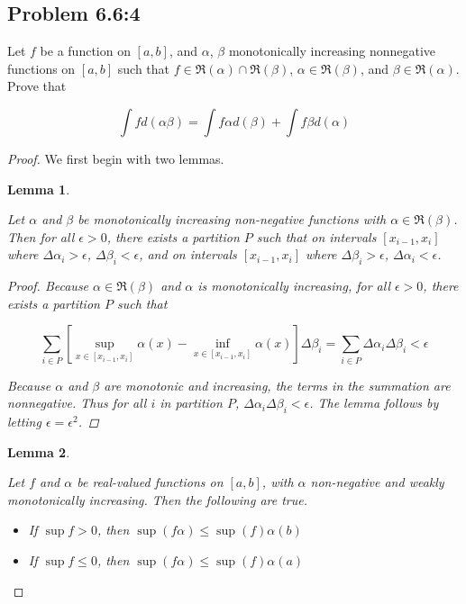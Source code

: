\documentclass{amsart}
\newcommand{\RiemannIntable}{
  \mathfrak{R}
}
\newtheorem{lemma}{Lemma}[subsubsection]
\begin{document}
\subsection*{Problem 6.6:4}

Let $f$ be a function on $[a, b]$, and $\alpha$, $\beta$ monotonically increasing nonnegative functions on $[a, b]$ such that $f \in \RiemannIntable(\alpha) \cap \RiemannIntable(\beta)$, $\alpha \in \RiemannIntable(\beta)$, and $\beta \in \RiemannIntable(\alpha)$. Prove that

\[
\int f d(\alpha \beta) = \int f \alpha d(\beta) + \int f \beta d(\alpha)
\]

\begin{proof}

We first begin with two lemmas.

\begin{lemma}
\label{alphaAndBeta}

Let $\alpha$ and $\beta$ be monotonically increasing non-negative functions with $\alpha \in \RiemannIntable(\beta)$. Then for all $\epsilon > 0$, there exists a partition $P$ such that on intervals $[x_{i-1}, x_i]$ where $\Delta \alpha_i > \epsilon$, $\Delta \beta_i < \epsilon$, and on intervals $[x_{i-1}, x_i]$ where $\Delta \beta_i > \epsilon$, $\Delta \alpha_i < \epsilon$.

\begin{proof}
Because $\alpha \in \RiemannIntable(\beta)$ and $\alpha$ is monotonically increasing, for all $\epsilon > 0$, there exists a partition $P$ such that

\[
\sum_{i \in P} [ \sup_{x \in [x_{i-1}, x_i]} \alpha(x) 
- \inf_{x \in [x_{i-1}, x_i]} \alpha(x) ]
\Delta \beta_i
= \sum_{i \in P} \Delta \alpha_i \Delta \beta_i < \epsilon
\]

Because $\alpha$ and $\beta$ are monotonic and increasing, the terms in the summation are nonnegative. Thus for all $i$ in partition $P$, $\Delta \alpha_i \Delta \beta_i < \epsilon$. The lemma follows by letting $\epsilon = \epsilon^2$.

\end{proof}
\end{lemma}

\begin{lemma}
\label{supAndInf}

Let $f$ and $\alpha$ be real-valued functions on $[a, b]$, with $\alpha$ non-negative and weakly monotonically increasing. Then the following are true.

\begin{itemize}
	\item If $\sup f > 0$, then $\sup (f \alpha) \leq \sup(f) \alpha(b)$
	\item If $\sup f \leq 0$, then $\sup (f \alpha) \leq \sup(f) \alpha(a)$
\end{itemize}


\end{lemma}
\end{proof}
\end{document}
